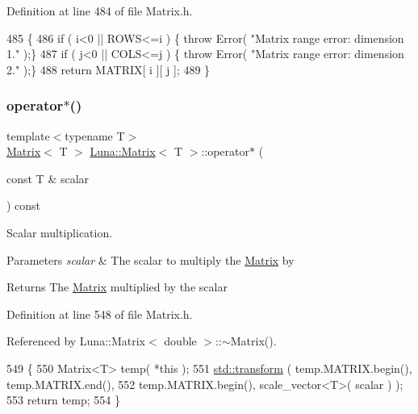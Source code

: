 Definition at line 484 of file Matrix.\+h.


\begin{DoxyCode}
485   \{
486     \textcolor{keywordflow}{if} ( i<0 || ROWS<=i )   \{ \textcolor{keywordflow}{throw} Error( \textcolor{stringliteral}{"Matrix range error: dimension 1."} );\}
487     \textcolor{keywordflow}{if} ( j<0 || COLS<=j )   \{ \textcolor{keywordflow}{throw} Error( \textcolor{stringliteral}{"Matrix range error: dimension 2."} );\}
488     \textcolor{keywordflow}{return} MATRIX[ i ][ j ];
489   \}
\end{DoxyCode}
\mbox{\label{classLuna_1_1Matrix_aae7fad5b10fa6bcdcb6bff124afa4149}} 
\subsubsection{\texorpdfstring{operator$\ast$()}{operator*()}\hspace{0.1cm}{\footnotesize\ttfamily [1/3]}}
{\footnotesize\ttfamily template$<$typename T$>$ \\
\hyperlink{classLuna_1_1Matrix}{Matrix}$<$ T $>$ \hyperlink{classLuna_1_1Matrix}{Luna\+::\+Matrix}$<$ T $>$\+::operator$\ast$ (\begin{DoxyParamCaption}\item[{const T \&}]{scalar }\end{DoxyParamCaption}) const\hspace{0.3cm}{\ttfamily [inline]}}



Scalar multiplication. 


\begin{DoxyParams}{Parameters}
{\em scalar} & The scalar to multiply the \hyperlink{classLuna_1_1Matrix}{Matrix} by \\
\hline
\end{DoxyParams}
\begin{DoxyReturn}{Returns}
The \hyperlink{classLuna_1_1Matrix}{Matrix} multiplied by the scalar 
\end{DoxyReturn}


Definition at line 548 of file Matrix.\+h.



Referenced by Luna\+::\+Matrix$<$ double $>$\+::$\sim$\+Matrix().


\begin{DoxyCode}
549   \{
550     Matrix<T> temp( *\textcolor{keyword}{this} );
551     \hyperlink{namespaceHeat__plot_aeaa6785bedcad63b4bd40e8cb1bad8a0}{std::transform} ( temp.MATRIX.begin(), temp.MATRIX.end(),
552                      temp.MATRIX.begin(), scale\_vector<T>( scalar ) );
553     \textcolor{keywordflow}{return} temp;
554   \}
\end{DoxyCode}
\mbox{\label{classLuna_1_1Matrix_a147f05fd2ce2ce50f5338284f2843998}} 
